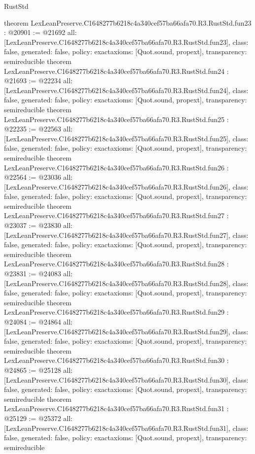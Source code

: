\begin{lexlean}{RustStd}
\begin{coremodule}
{}
theorem LexLeanPreserve.C1648277b6218c4a340cef57ba66afa70.R3.RustStd.fun23 : @20901 := @21692 {
  all: [LexLeanPreserve.C1648277b6218c4a340cef57ba66afa70.R3.RustStd.fun23],
  class: false,
  generated: false,
  policy: exact{axioms: [Quot.sound, propext]},
  transparency: semireducible
}
theorem LexLeanPreserve.C1648277b6218c4a340cef57ba66afa70.R3.RustStd.fun24 : @21693 := @22234 {
  all: [LexLeanPreserve.C1648277b6218c4a340cef57ba66afa70.R3.RustStd.fun24],
  class: false,
  generated: false,
  policy: exact{axioms: [Quot.sound, propext]},
  transparency: semireducible
}
theorem LexLeanPreserve.C1648277b6218c4a340cef57ba66afa70.R3.RustStd.fun25 : @22235 := @22563 {
  all: [LexLeanPreserve.C1648277b6218c4a340cef57ba66afa70.R3.RustStd.fun25],
  class: false,
  generated: false,
  policy: exact{axioms: [Quot.sound, propext]},
  transparency: semireducible
}
theorem LexLeanPreserve.C1648277b6218c4a340cef57ba66afa70.R3.RustStd.fun26 : @22564 := @23036 {
  all: [LexLeanPreserve.C1648277b6218c4a340cef57ba66afa70.R3.RustStd.fun26],
  class: false,
  generated: false,
  policy: exact{axioms: [Quot.sound, propext]},
  transparency: semireducible
}
theorem LexLeanPreserve.C1648277b6218c4a340cef57ba66afa70.R3.RustStd.fun27 : @23037 := @23830 {
  all: [LexLeanPreserve.C1648277b6218c4a340cef57ba66afa70.R3.RustStd.fun27],
  class: false,
  generated: false,
  policy: exact{axioms: [Quot.sound, propext]},
  transparency: semireducible
}
theorem LexLeanPreserve.C1648277b6218c4a340cef57ba66afa70.R3.RustStd.fun28 : @23831 := @24083 {
  all: [LexLeanPreserve.C1648277b6218c4a340cef57ba66afa70.R3.RustStd.fun28],
  class: false,
  generated: false,
  policy: exact{axioms: [Quot.sound, propext]},
  transparency: semireducible
}
theorem LexLeanPreserve.C1648277b6218c4a340cef57ba66afa70.R3.RustStd.fun29 : @24084 := @24864 {
  all: [LexLeanPreserve.C1648277b6218c4a340cef57ba66afa70.R3.RustStd.fun29],
  class: false,
  generated: false,
  policy: exact{axioms: [Quot.sound, propext]},
  transparency: semireducible
}
theorem LexLeanPreserve.C1648277b6218c4a340cef57ba66afa70.R3.RustStd.fun30 : @24865 := @25128 {
  all: [LexLeanPreserve.C1648277b6218c4a340cef57ba66afa70.R3.RustStd.fun30],
  class: false,
  generated: false,
  policy: exact{axioms: [Quot.sound, propext]},
  transparency: semireducible
}
theorem LexLeanPreserve.C1648277b6218c4a340cef57ba66afa70.R3.RustStd.fun31 : @25129 := @25372 {
  all: [LexLeanPreserve.C1648277b6218c4a340cef57ba66afa70.R3.RustStd.fun31],
  class: false,
  generated: false,
  policy: exact{axioms: [Quot.sound, propext]},
  transparency: semireducible
}
\end{coremodule}
\end{lexlean}
